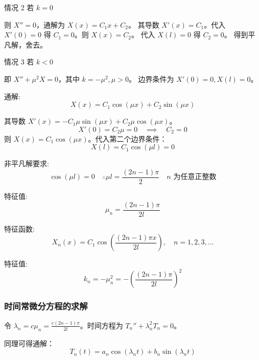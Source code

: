 \documentclass[12pt,a4paper]{article}
\numberwithin{subsection}{section}   %
\numberwithin{subsubsection}{subsection}
\theoremstyle{plain}
\theoremstyle{definition}
\theoremstyle{remark}
\theoremstyle{remark}
\begin{document}
	情况 2 \quad 若 \(k = 0\)
	
	则 \(X'' = 0\)，通解为 $X(x) = C_1 x + C_2$。
	其导数 $X'(x) = C_1$。代入 $X'(0)=0$ 得 $C_1=0$。则 $X(x) = C_2$。
	代入 $X(l)=0$ 得 $C_2=0$。
	得到平凡解，舍去。
	
	情况 3 \quad 若 \(k < 0\)
	
	即 \(X'' + \mu^2 X = 0\)，其中 \(k = -\mu^2, \mu > 0\)。
	边界条件为 $X'(0) = 0, X(l) = 0$。
	
	通解:
	\begin{equation}
		X(x) = C_1 \cos(\mu x) + C_2 \sin(\mu x)
	\end{equation}
	
	其导数 $X'(x) = -C_1 \mu \sin(\mu x) + C_2 \mu \cos(\mu x)$。
	\begin{equation}
		X'(0) = C_2 \mu = 0 \quad \implies \quad C_2 = 0
	\end{equation}
	则 $X(x) = C_1 \cos(\mu x)$。代入第二个边界条件：
	\begin{equation}
		X(l) = C_1 \cos(\mu l) = 0
	\end{equation}
	
	非平凡解要求:
	\begin{equation*}
		\cos(\mu l) = 0 \quad \therefore \mu l = \frac{(2n-1)\pi}{2} \quad n \text{ 为任意正整数}
	\end{equation*}
	
	特征值:
	\begin{equation}
		\mu_n = \frac{(2n-1)\pi}{2l}
	\end{equation}
	
	特征函数:
	\begin{equation}
		X_n(x) = C_1 \cos\left(\frac{(2n-1)\pi x}{2l}\right), \quad n = 1, 2, 3, \ldots
	\end{equation}
	
	特征值:
	\begin{equation}
		k_n = -\mu_n^2 = -\left(\frac{(2n-1)\pi}{2l}\right)^2
	\end{equation}
	
	\subsubsection{时间常微分方程的求解}
	令 $\lambda_n = c \mu_n = \frac{c(2n-1)\pi}{2l}$。时间方程为 $T_n'' + \lambda_n^2 T_n = 0$。
	
	同理可得通解：
	\begin{equation}
		T_n(t) = a_n \cos(\lambda_n t) + b_n \sin(\lambda_n t)
	\end{equation}
	
\end{document}
